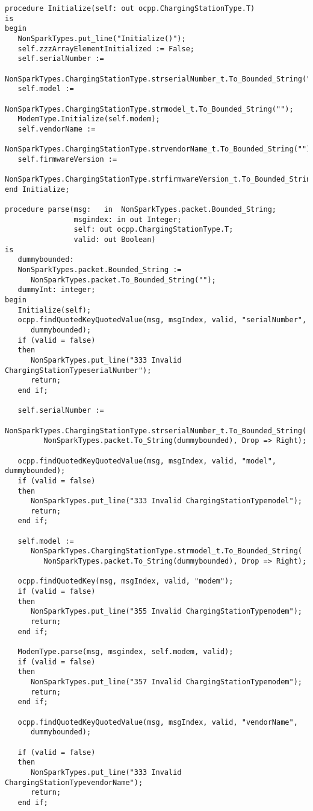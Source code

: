 \documentclass[12pt,openany,a4paper]{book}
\begin{document}
\begin{verbatim}
procedure Initialize(self: out ocpp.ChargingStationType.T)
is
begin
   NonSparkTypes.put_line("Initialize()");
   self.zzzArrayElementInitialized := False;
   self.serialNumber := 
      NonSparkTypes.ChargingStationType.strserialNumber_t.To_Bounded_String("");
   self.model := 
      NonSparkTypes.ChargingStationType.strmodel_t.To_Bounded_String("");
   ModemType.Initialize(self.modem);
   self.vendorName := 
   NonSparkTypes.ChargingStationType.strvendorName_t.To_Bounded_String("");
   self.firmwareVersion := 
   NonSparkTypes.ChargingStationType.strfirmwareVersion_t.To_Bounded_String("");
end Initialize;

procedure parse(msg:   in  NonSparkTypes.packet.Bounded_String;
                msgindex: in out Integer;
                self: out ocpp.ChargingStationType.T;
                valid: out Boolean)
is
   dummybounded:
   NonSparkTypes.packet.Bounded_String := 
      NonSparkTypes.packet.To_Bounded_String("");
   dummyInt: integer;
begin
   Initialize(self);
   ocpp.findQuotedKeyQuotedValue(msg, msgIndex, valid, "serialNumber", 
      dummybounded);
   if (valid = false) 
   then 
      NonSparkTypes.put_line("333 Invalid ChargingStationTypeserialNumber"); 
      return; 
   end if;

   self.serialNumber :=
      NonSparkTypes.ChargingStationType.strserialNumber_t.To_Bounded_String(
         NonSparkTypes.packet.To_String(dummybounded), Drop => Right);

   ocpp.findQuotedKeyQuotedValue(msg, msgIndex, valid, "model", dummybounded);
   if (valid = false) 
   then 
      NonSparkTypes.put_line("333 Invalid ChargingStationTypemodel"); 
      return; 
   end if;

   self.model :=
      NonSparkTypes.ChargingStationType.strmodel_t.To_Bounded_String(
         NonSparkTypes.packet.To_String(dummybounded), Drop => Right);

   ocpp.findQuotedKey(msg, msgIndex, valid, "modem");
   if (valid = false) 
   then 
      NonSparkTypes.put_line("355 Invalid ChargingStationTypemodem"); 
      return; 
   end if;

   ModemType.parse(msg, msgindex, self.modem, valid);
   if (valid = false) 
   then 
      NonSparkTypes.put_line("357 Invalid ChargingStationTypemodem"); 
      return; 
   end if;

   ocpp.findQuotedKeyQuotedValue(msg, msgIndex, valid, "vendorName", 
      dummybounded);

   if (valid = false) 
   then 
      NonSparkTypes.put_line("333 Invalid ChargingStationTypevendorName"); 
      return; 
   end if;


\end{verbatim}
\end{document}
